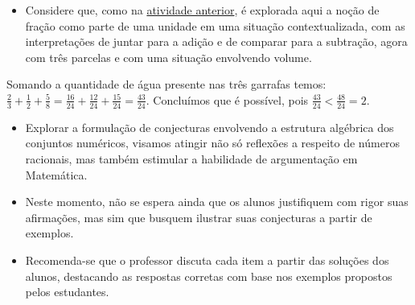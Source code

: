 \begin{orientacoes}{}{}

  \begin{itemize} %
    \item       Considere que, como na \hyperref[chap5-ativ13]{atividade anterior}, é explorada aqui a noção de fração como parte de uma unidade em uma situação contextualizada, com as interpretações de juntar para a adição e de comparar para a subtração, agora com três parcelas e com uma situação envolvendo volume.
\end{itemize} %
\end{orientacoes}

\begin{solucao}{}{}
  Somando a quantidade de água presente nas três garrafas temos:   $\frac{2}{3}+\frac{1}{2}+\frac{5}{8} = \frac{16}{24}+\frac{12}{24}+\frac{15}{24} = \frac{43}{24}$. Concluímos que é possível, pois   $\frac{43}{24}<\frac{48}{24}=2$.
\end{solucao}



\begin{objetivos}[label=chap5-ativ15]{}{}

  \begin{itemize} %
    \item       Explorar a formulação de conjecturas envolvendo a estrutura algébrica dos conjuntos numéricos, visamos atingir não só reflexões a respeito de números racionais, mas também estimular a habilidade de argumentação em Matemática.
\end{itemize} %

\end{objetivos}

\begin{orientacoes}{}{}

  \begin{itemize} %
    \item       Neste momento, não se espera ainda que os alunos justifiquem com rigor suas afirmações, mas sim que busquem ilustrar suas conjecturas a partir de exemplos.
    \item       Recomenda-se que o professor discuta cada item a partir das soluções dos alunos, destacando as respostas corretas com base nos exemplos propostos pelos estudantes.
\end{itemize} %

\end{orientacoes}

